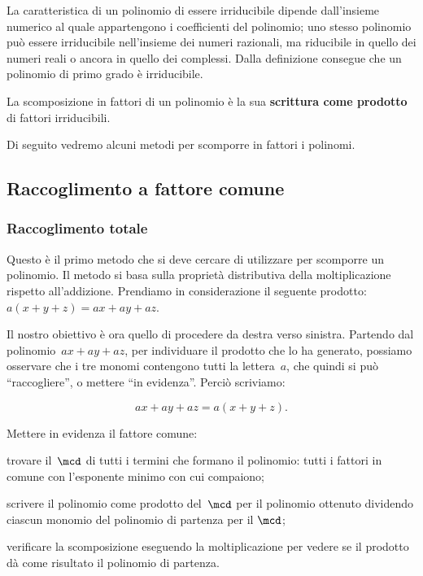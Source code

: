 La caratteristica di un polinomio di essere irriducibile dipende 
dall'insieme 
numerico al quale appartengono i coefficienti del polinomio;
uno stesso polinomio può essere irriducibile nell'insieme dei numeri 
razionali, ma riducibile in quello dei numeri reali o ancora in quello 
dei complessi.
Dalla definizione consegue che un polinomio di primo grado è 
irriducibile.

\begin{definizione}{}{}
La scomposizione in fattori di un polinomio è la sua \textbf{scrittura 
come prodotto} di fattori irriducibili.
\end{definizione}

Di seguito vedremo alcuni metodi per scomporre in fattori i polinomi.


\subsection{Raccoglimento a fattore comune}
\label{subsec:divpol_fattorecomune}

\subsubsection{Raccoglimento totale}

Questo è il primo metodo che si deve cercare di utilizzare per scomporre 
un polinomio.
Il metodo si basa sulla proprietà distributiva della moltiplicazione 
rispetto all'addizione.
Prendiamo in considerazione il seguente prodotto:~\(a(x+y+z)=ax+ay+az\).

Il nostro obiettivo è ora quello di procedere da destra verso sinistra. 
Partendo dal polinomio~\(ax+ay+az\), per individuare il 
prodotto che lo ha generato, possiamo osservare che i tre monomi 
contengono tutti la lettera~\(a\), che quindi si può ``raccogliere'',
o mettere ``in evidenza''. Perciò scriviamo: 

\vspace{-1.5em}
\[ax+ay+az=a(x+y+z).\]

\begin{procedura}{}{}
Mettere in evidenza il fattore comune:
\begin{enumeratea}
\item trovare il~\(\mcd\) di tutti i termini che formano il polinomio: 
tutti i fattori in comune con l'esponente minimo con cui compaiono;
\item scrivere il polinomio come prodotto del~\(\mcd\) per il polinomio 
ottenuto dividendo ciascun monomio del polinomio di partenza per il 
\(\mcd\); 
\item verificare la scomposizione eseguendo la moltiplicazione per 
vedere se il prodotto dà come risultato il polinomio di partenza.
\end{enumeratea}
\end{procedura}

